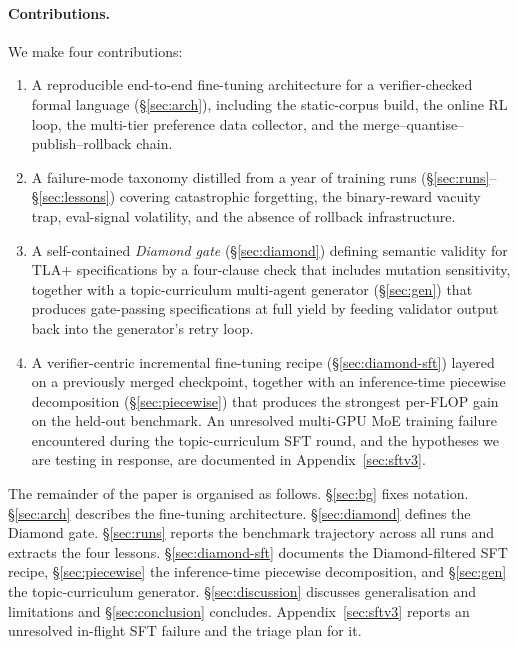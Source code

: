 \documentclass[11pt]{article}
\begin{document}
\paragraph{Contributions.} We make four contributions:
\begin{enumerate}[leftmargin=1.4em,itemsep=2pt]
\item A reproducible end-to-end fine-tuning architecture for a verifier-checked
  formal language (\S\ref{sec:arch}), including the static-corpus build,
  the online RL loop, the multi-tier preference data collector, and the
  merge--quantise--publish--rollback chain.
\item A failure-mode taxonomy distilled from a year of training runs
  (\S\ref{sec:runs}--\S\ref{sec:lessons}) covering catastrophic
  forgetting, the binary-reward vacuity trap, eval-signal volatility, and
  the absence of rollback infrastructure.
\item A self-contained \emph{Diamond gate} (\S\ref{sec:diamond}) defining
  semantic validity for TLA+ specifications by a four-clause check that
  includes mutation sensitivity, together with a topic-curriculum
  multi-agent generator (\S\ref{sec:gen}) that produces gate-passing
  specifications at full yield by feeding validator output back into the
  generator's retry loop.
\item A verifier-centric incremental fine-tuning recipe
  (\S\ref{sec:diamond-sft}) layered on a previously merged checkpoint,
  together with an inference-time piecewise decomposition
  (\S\ref{sec:piecewise}) that produces the strongest per-FLOP gain on
  the held-out benchmark. An unresolved multi-GPU MoE training failure
  encountered during the topic-curriculum SFT round, and the
  hypotheses we are testing in response, are documented in
  Appendix~\ref{sec:sftv3}.
\end{enumerate}

\noindent The remainder of the paper is organised as follows.
\S\ref{sec:bg} fixes notation. \S\ref{sec:arch} describes the
fine-tuning architecture. \S\ref{sec:diamond} defines the Diamond gate.
\S\ref{sec:runs} reports the benchmark trajectory across all runs and
extracts the four lessons. \S\ref{sec:diamond-sft} documents the
Diamond-filtered SFT recipe, \S\ref{sec:piecewise} the inference-time
piecewise decomposition, and \S\ref{sec:gen} the topic-curriculum
generator. \S\ref{sec:discussion} discusses generalisation and
limitations and \S\ref{sec:conclusion} concludes.
Appendix~\ref{sec:sftv3} reports an unresolved in-flight SFT failure
and the triage plan for it.
\end{document}
